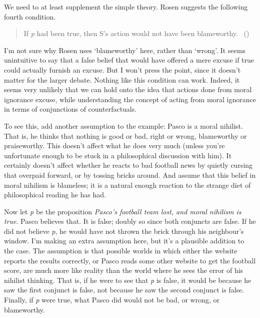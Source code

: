 \documentclass[
  10pt,
  letterpaper,
  twoside]{scrbook}
\begin{document}
We need to at least supplement the simple theory. Rosen suggests the
following fourth condition.

\begin{quote}
If \emph{p} had been true, then S's action would not have been
blameworthy. ~()
\end{quote}

I'm not sure why Rosen uses `blameworthy' here, rather than `wrong'. It
seems unintuitive to say that a false belief that would have offered a
mere excuse if true could actually furnish an excuse. But I won't press
the point, since it doesn't matter for the larger debate. Nothing like
this condition can work. Indeed, it seems very unlikely that we can hold
onto the idea that actions done from moral ignorance excuse, while
understanding the concept of acting from moral ignorance in terms of
conjunctions of counterfactuals.

To see this, add another assumption to the example: {Pasco} is a moral
nihilist. That is, he thinks that nothing is good or bad, right or
wrong, blameworthy or praiseworthy. This doesn't affect what he does
very much (unless you're unfortunate enough to be stuck in a
philosophical discussion with him). It certainly doesn't affect whether
he reacts to bad football news by quietly cursing that overpaid forward,
or by tossing bricks around. And assume that this belief in moral
nihilism is blameless; it is a natural enough reaction to the strange
diet of philosophical reading he has had.

Now let \emph{p} be the proposition \emph{Pasco's football team lost,
and moral nihilism is true}. {Pasco} believes that. It is false; doubly
so since both conjuncts are false. If he did not believe \emph{p}, he
would have not thrown the brick through his neighbour's window. I'm
making an extra assumption here, but it's a plausible addition to the
case. The assumption is that possible worlds in which either the website
reports the results correctly, or {Pasco} reads some other website to
get the football score, are much more like reality than the world where
he sees the error of his nihilist thinking. That is, if he were to see
that \emph{p} is false, it would be because he saw the first conjunct is
false, not because he saw the second conjunct is false. Finally, if
\emph{p} were true, what {Pasco} did would not be bad, or wrong, or
blameworthy.
\end{document}
